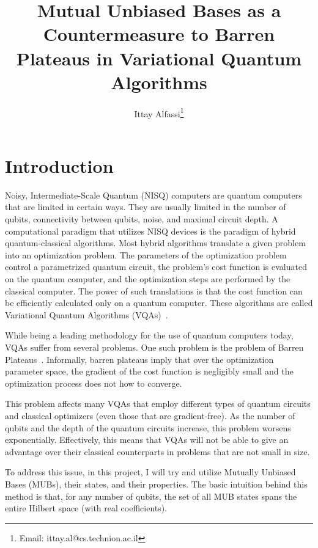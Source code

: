 \documentclass[a4paper,12pt]{article}
\title{Mutual Unbiased Bases as a Countermeasure to Barren Plateaus in Variational Quantum Algorithms}
\author{Ittay Alfassi\footnote{Email: ittay.al@cs.technion.ac.il}}
\begin{document}
\maketitle

\thispagestyle{fancy}

\tableofcontents

\section{Introduction}
Noisy, Intermediate-Scale Quantum (NISQ) computers are quantum computers that are limited in certain ways. They are usually limited in the number of qubits, connectivity between qubits, noise, and maximal circuit depth.
A computational paradigm that utilizes NISQ devices is the paradigm of hybrid quantum-classical algorithms.
Most hybrid algorithms translate a given problem into an optimization problem.
The parameters of the optimization problem control a parametrized quantum circuit, the problem's cost function is evaluated on the quantum computer, and the optimization steps are performed by the classical computer. The power of such translations is that the cost function can be efficiently calculated only on a quantum computer. These algorithms are called Variational Quantum Algorithms (VQAs)~\cite{Cerezo2021}.

While being a leading methodology for the use of quantum computers today, VQAs suffer from several problems. One such problem is the problem of Barren Plateaus~\cite{mcclean_barren_2018}. Informally, barren plateaus imply that over the optimization parameter space, the gradient of the cost function is negligibly small and the optimization process does not how to converge.

This problem affects many  VQAs that employ different types of quantum circuits and classical optimizers (even those that are gradient-free). As the number of qubits and the depth of the quantum circuits increase, this problem worsens exponentially.
Effectively, this means that VQAs will not be able to give an advantage over their classical counterparts in problems that are not small in size.

To address this issue, in this project, I will try and utilize Mutually Unbiased Bases (MUBs), their states, and their properties.
The basic intuition behind this method is that, for any number of qubits, the set of all MUB states spans the entire Hilbert space (with real coefficients).
\end{document}
